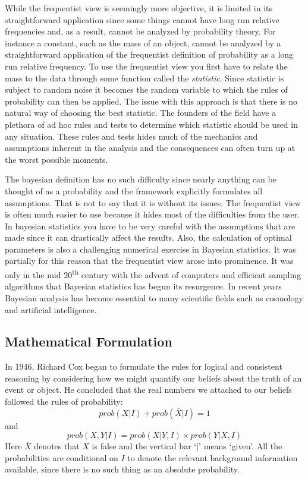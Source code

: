 \documentclass[12pt]{article}
\numberwithin{equation}{section}
\begin{document}
While the frequentist view is seemingly more objective, it is limited 
in its straightforward application since some things cannot have long 
run relative frequencies and, as a result, cannot be analyzed by 
probability theory. For instance a constant, such as the mass of an 
object, cannot be analyzed by a straightforward application of the 
frequentist definition of probability as a long run relative frequency. 
To use the frequentist view you first have to relate the mass to the 
data through some function called the \emph{statistic}. Since 
statistic is subject to random noise it becomes the random variable to 
which the rules of probability can then be applied. The issue with this 
approach is that there is no natural way of choosing the best 
statistic.\cite{sivia2006data} The founders of the field have a 	
plethora of ad hoc rules and tests to determine which statistic should 
be used in any situation. These rules and tests hides much of the 	
mechanics and assumptions inherent in the analysis and the consequences 
can often turn up at the worst possible moments.

The bayesian definition has no such difficulty since nearly anything 
can be thought of as a probability and the framework explicitly 
formulates all assumptions. That is not to say that it is without its 
issues. The frequentist view is often much easier to use because it 
hides most of the difficulties from the user. In bayesian statistics 
you have to be very careful with the assumptions that are made since it 
can drastically affect the results. Also, the calculation of optimal 
parameters is also a challenging numerical exercise in Bayesian 
statistics. It was partially for this reason that the frequentist view 
arose into prominence. It was only in the mid 20\textsuperscript{th} 
century with the advent of computers and efficient sampling algorithms 
that Bayesian statistics has begun its resurgence. In recent years 
Bayesian analysis has become essential to many scientific fields such 
as cosmology and artificial intelligence.\cite{von2011bayesian}
\subsection{Mathematical Formulation}
In 1946, Richard Cox began to formulate the rules for logical and consistent
reasoning by considering how we might quantify our beliefs about the truth of 
an event or object. He concluded that the real numbers we attached to our
beliefs followed the rules of probability:\cite{sivia2006data} 
\begin{equation} \label{eq:sumrule}
	prob(X|I) + prob(\overline{X}|I) = 1
\end{equation}
and 
\begin{equation} \label{eq:productrule}
	prob(X,Y|I) = prob(X|Y,I) \times prob(Y|X,I)
\end{equation}
Here $\overline{X}$ denotes that $X$ is false and the vertical bar `$|$' means `given'. 
All the probabilities are conditional on $I$ to denote the relevant background information 
available, since there is no such thing as an absolute probability. 
\end{document}
